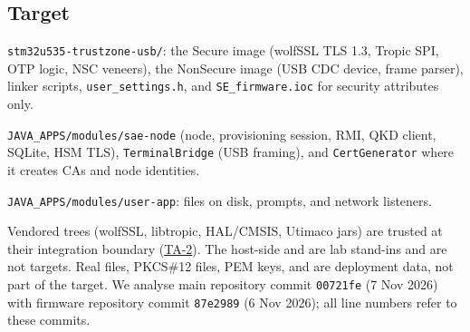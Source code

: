 \documentclass[11pt,a4paper]{article}
\begin{document}
\subsection{Target}
\begin{description}[style=nextline]
\item[SE] \texttt{stm32u535-trustzone-usb/}: the Secure image (wolfSSL TLS 1.3, Tropic SPI, OTP logic, NSC veneers), the NonSecure image (USB CDC device, frame parser), linker scripts, \texttt{user\_settings.h}, and \texttt{SE\_firmware.ioc} for security attributes only.
\item[SAE] \texttt{JAVA\_APPS/modules/sae-node} (node, provisioning session, RMI, QKD client, SQLite, HSM TLS), \texttt{TerminalBridge} (USB framing), and \texttt{CertGenerator} where it creates CAs and node identities.
\item[USER] \texttt{JAVA\_APPS/modules/user-app}: files on disk, prompts, and network listeners.
\end{description}
Vendored trees (wolfSSL, libtropic, HAL/CMSIS, Utimaco jars) are trusted at their integration boundary (\hyperref[ta:TA-2]{TA-2}). The host-side  and  are lab stand-ins and are not targets. Real  files, PKCS\#12 files, PEM keys, and  are deployment data, not part of the target. We analyse main repository commit \texttt{00721fe} (7 Nov 2026) with firmware repository commit \texttt{87e2989} (6 Nov 2026); all line numbers refer to these commits.
\end{document}
